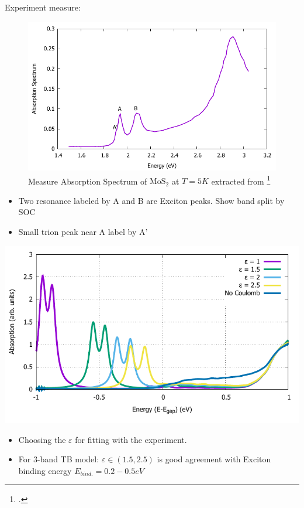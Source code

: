 \documentclass{beamer}
\begin{document}
	\begin{frame}
		Experiment measure:
		\begin{multicols}{2}
		\begin{figure}
	\includegraphics[width = 1\linewidth]{images/Experiment.pdf}
	\caption{Measure Absorption Spectrum of $\mathrm{MoS}_2$ at $T=5K$  extracted from \footcite{zhang_absorption_2014}}
	\end{figure}
	\columnbreak
	\begin{itemize}
		\item Two resonance labeled by A and B are Exciton peaks. Show band split by SOC
		\item Small trion peak near A label by A'
	\end{itemize}
	\end{multicols}
	\end{frame}
\begin{frame}
	\includegraphics[width=0.8\linewidth]{images/varyepsilon.pdf}
	\begin{itemize}
		\item Choosing the $\varepsilon$ for fitting with the experiment.
		\item For 3-band TB model: $\varepsilon \in (1.5,2.5)$ is good agreement with Exciton binding energy $E_{bind.}= 0.2-0.5 eV$ 
	\end{itemize}
\end{frame}
\end{document}

